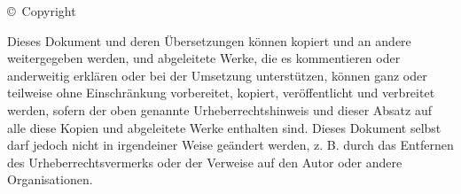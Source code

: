 \begin{flushleft}
    \copyright~Copyright~\the\year~\DICTDocAuthor
\end{flushleft}
Dieses Dokument und deren Übersetzungen können kopiert und an andere weitergegeben werden, und abgeleitete Werke, die es kommentieren oder anderweitig erklären oder bei der Umsetzung unterstützen, können ganz oder teilweise ohne Einschränkung vorbereitet, kopiert, veröffentlicht und verbreitet werden, sofern der oben genannte Urheberrechtshinweis und dieser Absatz auf alle diese Kopien und abgeleitete Werke enthalten sind. Dieses Dokument selbst darf jedoch nicht in irgendeiner Weise geändert werden, z. B. durch das Entfernen des Urheberrechtsvermerks oder der Verweise auf den Autor oder andere Organisationen.